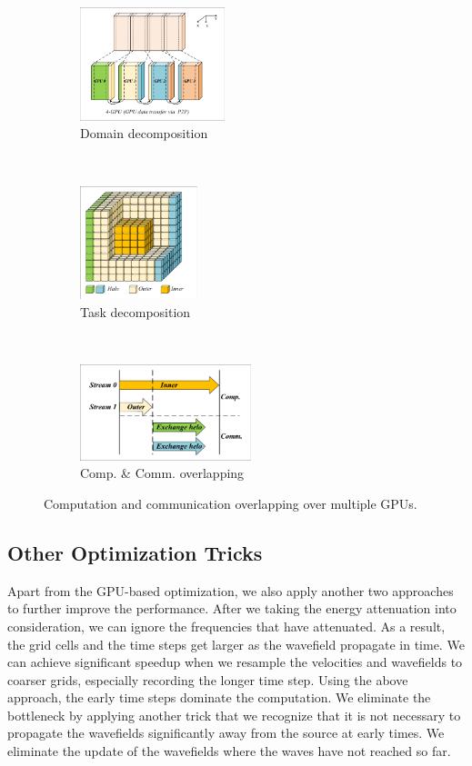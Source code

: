 \documentclass{paris17}
\begin{document}
\begin{figure}[h]
    \centering
    \begin{subfigure}[b]{0.3\textwidth}
        \centering
        \includegraphics[height=1.3in]{./fig/domain-decompose.pdf}
        \caption{Domain decomposition}
        \label{fig:domain-decomposition}
    \end{subfigure}%
    ~
    \begin{subfigure}[b]{0.3\textwidth}
        \centering
        \includegraphics[height=1.3in]{./fig/inner-outer.pdf}
        \caption{Task decomposition}
        \label{fig:task-decomposition}
    \end{subfigure}
    ~
    \begin{subfigure}[b]{0.3\textwidth}
        \centering
        \includegraphics[height=1.1in]{./fig/overlap.pdf}
        \caption{Comp. \& Comm. overlapping}
        \label{fig:overlap}
    \end{subfigure}
    \caption{Computation and communication overlapping over multiple GPUs.}
\end{figure}

\subsection{Other Optimization Tricks}

Apart from the GPU-based optimization, we also apply another two approaches to further improve the performance.  After we taking the energy attenuation into consideration, we can ignore the frequencies that have attenuated. As a result, the grid cells and the time steps get larger as the wavefield propagate in time. We can achieve significant speedup when we resample the velocities and wavefields to coarser grids, especially recording the longer time step. Using the above approach, the early time steps dominate the computation. We eliminate the bottleneck by applying another trick that we recognize that it is not necessary to propagate the wavefields significantly away from the source at early times. We eliminate the update of the wavefields where the waves have not reached so far.
\end{document}
